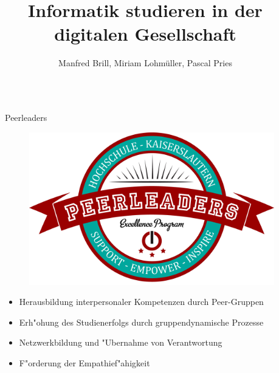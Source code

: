 \documentclass[final,hyperref={pdfpagelabels=false}]{beamer}
\title{\huge Informatik studieren in der digitalen Gesellschaft} %
\author{Manfred Brill, Miriam Lohmüller, Pascal Pries} %
\institute{Hochschule Kaiserslautern Fachbereich Informatik und Mikrosystemtechnik} %
\begin{document}

\begin{frame}[t] %

\begin{columns}[t] %

\begin{column}{.02\textwidth}\end{column} %

\begin{column}{.465\textwidth} %


\begin{block}{Peerleaders}

    \vspace{40px}

    \begin{figure}
        \includegraphics[width=0.4\linewidth]{imagesExample/Peerleaders_Logo}
    \end{figure}

    \begin{itemize}
        \item Herausbildung interpersonaler Kompetenzen durch Peer-Gruppen
        \item Erh"ohung des Studienerfolgs durch gruppendynamische Prozesse
        \item Netzwerkbildung und  "Ubernahme von Verantwortung
        \item F"orderung der Empathief"ahigkeit
    \end{itemize}


\end{block}
\end{column}
\end{columns}
\end{frame}
\end{document}
